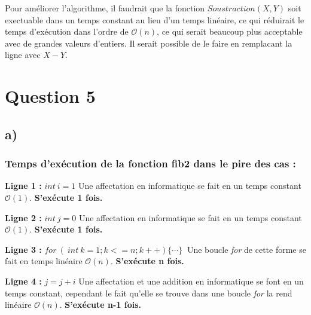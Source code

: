 \documentclass[12pt]{article}
\begin{document}
    \noindent Pour améliorer l'algorithme, il faudrait que la fonction
    \( Soustraction(X, Y) \) soit exectuable dans un temps constant au lieu d'un
    temps linéaire, ce qui réduirait le temps d'exécution dans l'ordre de
    \( \mathcal{O}(n) \), ce qui serait beaucoup plus acceptable avec de grandes
    valeurs d'entiers. Il serait possible de le faire en remplacant la ligne
    avec \( X - Y \).

  \newpage

  \section*{Question 5}
  	\subsection*{a)}

  	  \subsubsection*{Temps d'exécution de la fonction fib2 dans le pire des cas :}

  	    \noindent \textbf{Ligne 1 :} \( int \: i = 1 \) \newline
        Une affectation en informatique se fait en un temps constant
        \( \mathcal{O}(1) \). \newline
		\textbf{S'exécute 1 fois.} \newline

        \noindent \textbf{Ligne 2 :} \( int \: j = 0 \) \newline
        Une affectation en informatique se fait en un temps constant
        \( \mathcal{O}(1) \). \newline
		\textbf{S'exécute 1 fois.} \newline

        \noindent \textbf{Ligne 3 :}  \( for\: (\:int \: k=1;k<=n;k++) \{ \cdots \} \: \) \newline
        Une boucle \textit{for} de cette forme se fait en temps linéaire
        \( \mathcal{O}(n) \). \newline
        \textbf{S'exécute n fois.} \newline

        \noindent \textbf{Ligne 4 :} \( j=j+i \) \newline
        Une affectation et une addition en informatique se font en un temps constant, \newline
        cependant le fait qu'elle se trouve dans une boucle \textit{for} la rend linéaire
        \( \mathcal{O}(n) \). \newline
		\textbf{S'exécute n-1 fois.} \newline
\end{document}
